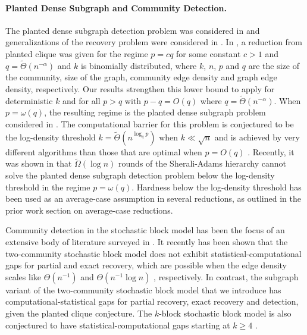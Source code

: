 \paragraph{Planted Dense Subgraph and Community Detection.} The planted dense subgraph detection problem was considered in \cite{arias2014community, butucea2013detection, verzelen2015community, hajek2015computational} and generalizations of the recovery problem were considered in \cite{chen2016statistical, hajek2016information, montanari2015finding, candogan2018finding}. In \cite{hajek2015computational}, a reduction from planted clique was given for the regime $p = cq$ for some constant $c > 1$ and $q = \tilde{\Theta}(n^{-\alpha})$ and $k$ is binomially distributed, where $k$, $n$, $p$ and $q$ are the size of the community, size of the graph, community edge density and graph edge density, respectively. Our results strengthen this lower bound to apply for deterministic $k$ and for all $p > q$ with $p - q = O(q)$ where $q = \tilde{\Theta}(n^{-\alpha})$. When $p = \omega(q)$, the resulting regime is the planted dense subgraph problem considered in \cite{bhaskara2010detecting}. The computational barrier for this problem is conjectured to be the log-density threshold $k = \tilde{\Theta}(n^{\log_q p})$ when $k \ll \sqrt{n}$ and is achieved by very different algorithms than those that are optimal when $p = O(q)$ \cite{chlamtac2012everywhere, chlamtavc2017minimizing}. Recently, it was shown in \cite{chlamtac2018sherali} that $\tilde{\Omega}(\log n)$ rounds of the Sherali-Adams hierarchy cannot solve the planted dense subgraph detection problem below the log-density threshold in the regime $p = \omega(q)$. Hardness below the log-density threshold has been used as an average-case assumption in several reductions, as outlined in the prior work section on average-case reductions.

Community detection in the stochastic block model has been the focus of an extensive body of literature surveyed in \cite{abbe2017community}. It recently has been shown that the two-community stochastic block model does not exhibit statistical-computational gaps for partial and exact recovery, which are possible when the edge density scales like $\Theta(n^{-1})$ \cite{mossel2012stochastic, mossel2013proof, massoulie2014community} and $\Theta(n^{-1}\log n)$ \cite{mossel2014consistency, hajek2016achieving, abbe2016exact}, respectively. In contrast, the subgraph variant of the two-community stochastic block model that we introduce has computational-statistical gaps for partial recovery, exact recovery and detection, given the planted clique conjecture. The $k$-block stochastic block model is also conjectured to have statistical-computational gaps starting at $k \ge 4$ \cite{abbe2015detection}.

